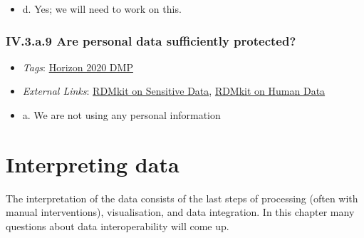\documentclass[a4paper,12pt]{report}
\begin{document}
\begin{itemize}
  \item[\CheckmarkBold] d. Yes; we will need to work on this.
\end{itemize}




\subsection*{\protect\textcolor{colorSecId}{IV.3.a.9} Are personal data sufficiently protected?}

\label{10a10ffd-bfe1-4c6b-bbb6-3dfb1e63a5d5.614ab69d-55a6-4214-b384-00ba21ce92a1.b2f76c0a-847a-403c-9ed6-09cad10e625e.d5990471-0618-42cd-92cb-bbbfd4f61532}


\begin{itemize}
  \item \textit{Tags}: \ul{Horizon 2020 DMP}
  
  \item \textit{External Links}: \href{https://rdmkit.elixir-europe.org/sensitive_data.html}{RDMkit on Sensitive Data}, \href{https://rdmkit.elixir-europe.org/human_data.html#processing-and-analysing-human-research-data}{RDMkit on Human Data}\end{itemize}




\begin{itemize}
  \item[\CheckmarkBold] a. We are not using any personal information
\end{itemize}








\chapter{Interpreting data}
\label{83438863-0aa0-4458-b14b-2b2c0d4f811d}
\begin{markdown}
The interpretation of the data consists of the last steps of processing (often with manual interventions), visualisation, and data integration. In this chapter many questions about data interoperability will come up.
\end{markdown}
\end{document}
